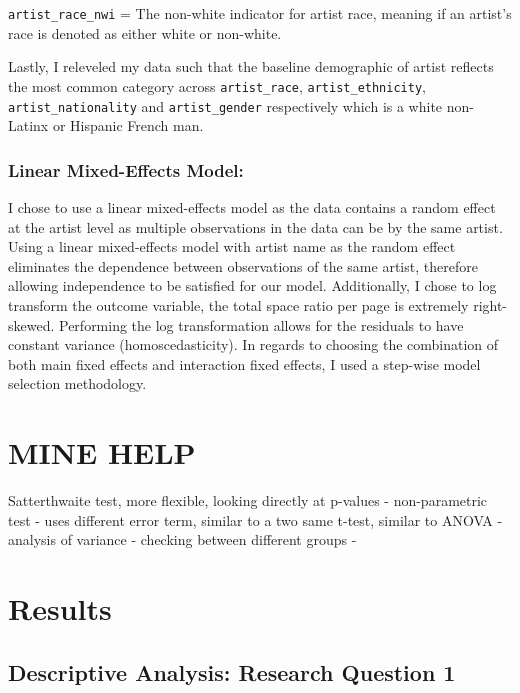 \documentclass[
  letterpaper,
  DIV=11,
  numbers=noendperiod]{scrreprt}
\begin{document}
\texttt{artist\_race\_nwi} = The non-white indicator for artist race,
meaning if an artist's race is denoted as either white or non-white.

Lastly, I releveled my data such that the baseline demographic of artist
reflects the most common category across \texttt{artist\_race},
\texttt{artist\_ethnicity}, \texttt{artist\_nationality} and
\texttt{artist\_gender} respectively which is a white non-Latinx or
Hispanic French man.

\hypertarget{linear-mixed-effects-model}{%
\subsection{Linear Mixed-Effects
Model:}\label{linear-mixed-effects-model}}

I chose to use a linear mixed-effects model as the data contains a
random effect at the artist level as multiple observations in the data
can be by the same artist. Using a linear mixed-effects model with
artist name as the random effect eliminates the dependence between
observations of the same artist, therefore allowing independence to be
satisfied for our model. Additionally, I chose to log transform the
outcome variable, the total space ratio per page is extremely
right-skewed. Performing the log transformation allows for the residuals
to have constant variance (homoscedasticity). In regards to choosing the
combination of both main fixed effects and interaction fixed effects, I
used a step-wise model selection methodology.

\hypertarget{mine-help}{%
\chapter{MINE HELP}\label{mine-help}}

Satterthwaite test, more flexible, looking directly at p-values -
non-parametric test - uses different error term, similar to a two same
t-test, similar to ANOVA - analysis of variance - checking between
different groups -

\hypertarget{results}{%
\chapter{Results}\label{results}}

\hypertarget{descriptive-analysis-research-question-1}{%
\section{Descriptive Analysis: Research Question
1}\label{descriptive-analysis-research-question-1}}
\end{document}

